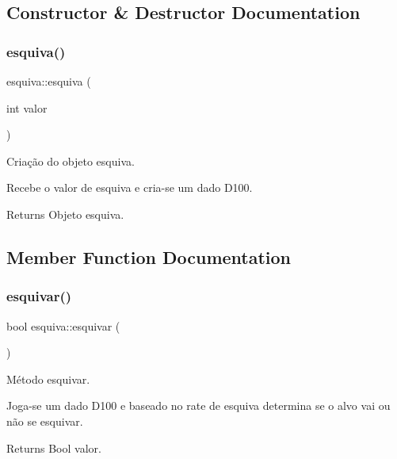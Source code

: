 \subsection{Constructor \& Destructor Documentation}
\mbox{\label{classesquiva_af611f7fe8c69b85f58e1d3eb41af611a}} 
\subsubsection{\texorpdfstring{esquiva()}{esquiva()}}
{\footnotesize\ttfamily esquiva\+::esquiva (\begin{DoxyParamCaption}\item[{int}]{valor }\end{DoxyParamCaption})}



Criação do objeto esquiva. 

Recebe o valor de esquiva e cria-\/se um dado D100. \begin{DoxyReturn}{Returns}
Objeto esquiva. 
\end{DoxyReturn}


\subsection{Member Function Documentation}
\mbox{\label{classesquiva_a52c90c2a26c3d27e1549e5469c49c1bb}} 
\subsubsection{\texorpdfstring{esquivar()}{esquivar()}}
{\footnotesize\ttfamily bool esquiva\+::esquivar (\begin{DoxyParamCaption}{ }\end{DoxyParamCaption})}



Método esquivar. 

Joga-\/se um dado D100 e baseado no rate de esquiva determina se o alvo vai ou não se esquivar. \begin{DoxyReturn}{Returns}
Bool valor. 
\end{DoxyReturn}
\mbox{\label{classesquiva_a0defb7805011650e62e3e8c1cf362a53}} 
